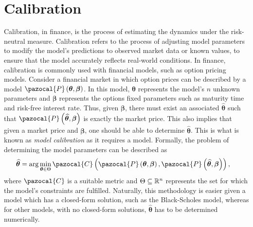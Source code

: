 \section{Calibration}\label{Sec.Calibration}
Calibration, in finance, is the process of estimating the dynamics under the risk-neutral measure. Calibration refers to the process of adjusting model parameters to modify the model's predictions to observed market data or known values, to ensure that the model accurately reflects real-world conditions. In finance, calibration is commonly used with financial models, such as option pricing models. Consider a financial market in which option prices can be described by a model $\pazocal{P}\left(\bm\theta,\bm\beta\right)$. In this model, $\bm\theta$ represents the model's $n$ unknown parameters and $\bm\beta$ represents the options fixed parameters such as maturity time and risk-free interest rate. Thus, given $\bm\beta$, there must exist an associated $\widehat{\bm\theta}$ such that $\pazocal{P}\left(\widehat{\bm\theta},\bm\beta\right)$ is exactly the market price. This also implies that given a market price and $\bm\beta$, one should be able to determine $\widehat{\bm\theta}$. This is what is known as \emph{model calibration} as it requires a model. Formally, the problem of determining the model parameters can be described as
\begin{align*}
    \widehat{\bm\theta} &= \arg\min_{\bm\theta\in\Theta}\pazocal{C}\left(\pazocal{P}\left(\bm\theta,\bm\beta\right),\pazocal{P}\left(\widehat{\bm\theta},\bm\beta\right)\right),
\end{align*}
where $\pazocal{C}$ is a suitable metric and $\Theta\subseteq\mathbb{R}^n$ represents the set for which the model's constraints are fulfilled. Naturally, this methodology is easier given a model which has a closed-form solution, such as the Black-Scholes model, whereas for other models, with no closed-form solutions, $\widehat{\bm\theta}$ has to be determined numerically.

